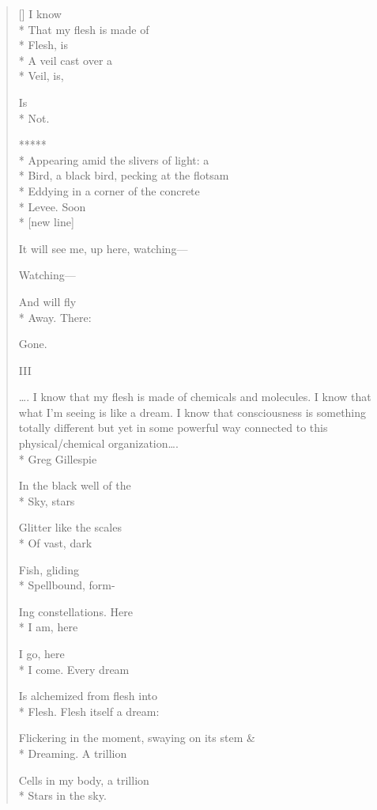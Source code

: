 \begin{verse}[\versewidth]
I know\\*
That my flesh is made of\\*
Flesh, is\\*
A veil cast over a\\*
Veil, is,

Is\\*
Not.

     *****\\*
Appearing amid the slivers of light: a\\*
Bird, a black bird, pecking at the flotsam\\*
Eddying in a corner of the concrete\\*
Levee.     Soon\\*
[new line]

It will see me, up here, watching---

Watching---

And will fly\\*
Away.     There:

Gone.  

                        III

     \ldots . I know that my flesh is made of chemicals and molecules. I know that what I'm seeing is like a dream. I know that consciousness is something totally different but yet in some powerful way connected to this physical/chemical organization\ldots .\\*
                                                                                                    Greg Gillespie

In the black well of the\\*
Sky,   stars

Glitter like the scales\\*
Of vast, dark

Fish, gliding\\*
Spellbound,   form-

Ing constellations.   Here\\*
I am, here

I go, here\\*
I come.     Every dream

Is alchemized from flesh into\\*
Flesh.   Flesh itself a dream:

Flickering in the moment, swaying on its stem \&\\*
Dreaming.    A trillion

Cells in my body, a trillion\\*
Stars in the sky.


\end{verse}
